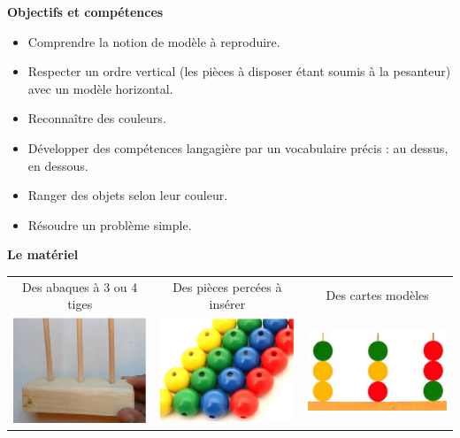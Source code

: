 \Recreation %


\setcounter{exercice}{0}

\begin{exercice*} %

{\bf Objectifs et compétences}
   \begin{itemize}
      \item Comprendre la notion de modèle à reproduire.
      \item Respecter un ordre vertical (les pièces à disposer étant soumis à la pesanteur) avec un modèle horizontal.
      \item Reconnaître des couleurs.
      \item Développer des compétences langagière par un vocabulaire précis : au dessus, en dessous.
      \item Ranger des objets selon leur couleur.
      \item Résoudre un problème simple. \medskip
   \end{itemize}

{\bf Le matériel}
\begin{center}
   \begin{tabular}{C{4.5}|C{4.5}|C{4.5}}
      Des abaques à 3 ou 4 tiges & Des pièces percées à insérer & Des cartes modèles \\
      \includegraphics[width=4cm]{Geometrie_did/Images/Geo6_activites_abaques_tiges1}
      &
      \includegraphics[width=4cm]{Geometrie_did/Images/Geo6_activites_abaques_tiges2}
      &
      \includegraphics[width=4.5cm]{Geometrie_did/Images/Geo6_activites_abaques_tiges3}
      \\
   \end{tabular} \\
\end{center}


\end{exercice*}
